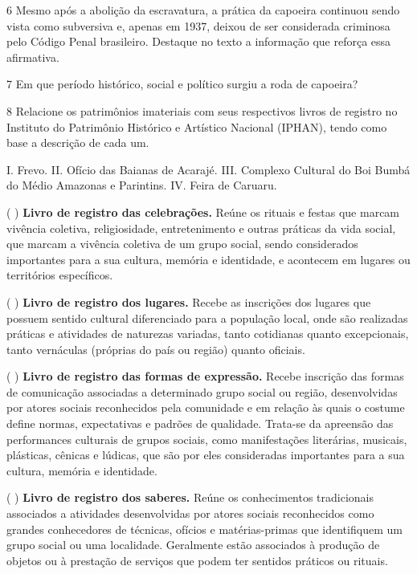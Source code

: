 \num{6} Mesmo após a abolição da escravatura, a prática da capoeira continuou
  sendo vista como subversiva e, apenas em 1937, deixou de ser considerada
  criminosa pelo Código Penal brasileiro. Destaque no texto a informação
  que reforça essa afirmativa.


\num{7} Em que período histórico, social e político surgiu a roda de
  capoeira?


\num{8} Relacione os patrimônios imateriais com seus respectivos livros de
  registro no Instituto do Patrimônio Histórico e Artístico Nacional
  (IPHAN), tendo como base a descrição de cada um.

I. Frevo.
II. Ofício das Baianas de Acarajé.
III. Complexo Cultural do Boi Bumbá do Médio Amazonas e Parintins.
IV. Feira de Caruaru.

(  ) \textbf{Livro de registro das celebrações.} Reúne os rituais e
festas que marcam vivência coletiva, religiosidade, entretenimento e
outras práticas da vida social, que marcam a vivência coletiva de um
grupo social, sendo considerados importantes para a sua cultura, memória
e identidade, e acontecem em lugares ou territórios específicos.

(  ) \textbf{Livro de registro dos lugares.} Recebe as inscrições dos
lugares que possuem sentido cultural diferenciado para a população
local, onde são realizadas práticas e atividades de naturezas variadas,
tanto cotidianas quanto excepcionais, tanto vernáculas (próprias do país
ou região) quanto oficiais.

(  ) \textbf{Livro de registro das formas de expressão.} Recebe 
inscrição das formas de comunicação associadas a determinado grupo
social ou região, desenvolvidas por atores sociais reconhecidos pela
comunidade e em relação às quais o costume define normas, expectativas e
padrões de qualidade. Trata-se da apreensão das performances culturais
de grupos sociais, como manifestações literárias, musicais, plásticas,
cênicas e lúdicas, que são por eles consideradas importantes para a sua
cultura, memória e identidade.

(  ) \textbf{Livro de registro dos saberes.} Reúne os 
conhecimentos tradicionais associados a atividades desenvolvidas 
por atores sociais reconhecidos como grandes
conhecedores de técnicas, ofícios e matérias-primas que identifiquem um
grupo social ou uma localidade. Geralmente estão associados à produção
de objetos ou à prestação de serviços que podem ter sentidos práticos ou
rituais.


